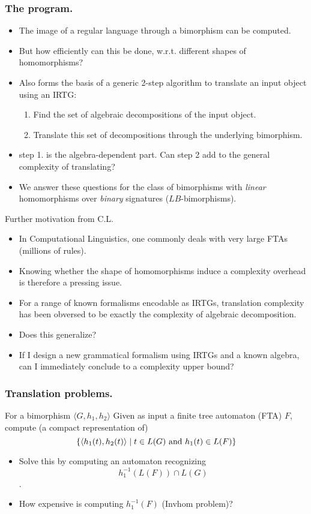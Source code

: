 \documentclass{beamer}
\begin{document}
\begin{frame}
  \frametitle{The program.}
  \begin{itemize}
  \item The image of a regular language through a bimorphism can be computed.
  \item \alert{But how efficiently can this be done, w.r.t. different shapes of homomorphisms?}
  \item Also forms the basis of a generic 2-step algorithm to translate an input object using an IRTG:
    \begin{enumerate}
    \item Find the set of algebraic decompositions of the input object.
    \item Translate this set of decompositions through the underlying bimorphism.
    \end{enumerate}
  \item \alert{step 1. is the algebra-dependent part. Can step 2 add to the general complexity of translating?}
  \item We answer these questions for the class of bimorphisms with \emph{linear} homomorphisms over \emph{binary} signatures ($LB$-bimorphisms).
  \end{itemize}
\end{frame}

\begin{frame}{Further motivation from C.L.}
  \begin{itemize}
  \item In Computational Linguistics, one commonly deals with very large FTAs (millions of rules).
  \item Knowing whether the shape of homomorphisms induce a complexity overhead is therefore a pressing issue.
  \item For a range of known formalisms encodable as IRTGs, translation complexity has been obversed to be exactly the complexity of algebraic decomposition.
  \item Does this generalize?
  \item If I design a new grammatical formalism using IRTGs and a known algebra, can I immediately conclude to a complexity upper bound?
  \end{itemize}
\end{frame}

\begin{frame}
  \frametitle{Translation problems.}

  \begin{block}{For a bimorphism $\langle G, h_1, h_2 \rangle$}
    Given as input a finite tree automaton (FTA) $F$, compute (a compact representation of)
    \[ \{ \langle h_1(t), h_2(t) \rangle \mid t \in L(G) \textnormal{ and } h_1(t) \in L(F) \} \]
  \end{block}
  \begin{itemize}
  \item Solve this by computing an automaton recognizing \[h_1^{-1}(L(F)) \cap L(G)\].
  \item \alert{How expensive is computing $h_1^{-1}(F)$ (Invhom problem)?}
  \end{itemize}
\end{frame}
\end{document}
